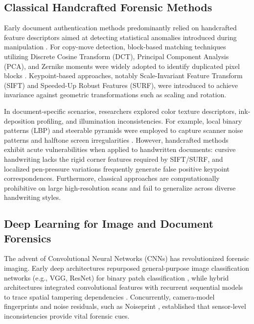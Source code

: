 \documentclass[runningheads]{llncs}
\begin{document}
\subsection{Classical Handcrafted Forensic Methods}\label{subsec2_1}
Early document authentication methods predominantly relied on handcrafted feature descriptors aimed at detecting statistical anomalies introduced during manipulation \cite{bib1}. For copy-move detection, block-based matching techniques utilizing Discrete Cosine Transform (DCT), Principal Component Analysis (PCA), and Zernike moments were widely adopted to identify duplicated pixel blocks \cite{bib1}. Keypoint-based approaches, notably Scale-Invariant Feature Transform (SIFT) and Speeded-Up Robust Features (SURF), were introduced to achieve invariance against geometric transformations such as scaling and rotation.

In document-specific scenarios, researchers explored color texture descriptors, ink-deposition profiling, and illumination inconsistencies. For example, local binary patterns (LBP) and steerable pyramids were employed to capture scanner noise patterns and halftone screen irregularities \cite{bib1}. However, handcrafted methods exhibit acute vulnerabilities when applied to handwritten documents: cursive handwriting lacks the rigid corner features required by SIFT/SURF, and localized pen-pressure variations frequently generate false positive keypoint correspondences. Furthermore, classical approaches are computationally prohibitive on large high-resolution scans and fail to generalize across diverse handwriting styles.

\subsection{Deep Learning for Image and Document Forensics}\label{subsec2_2}
The advent of Convolutional Neural Networks (CNNs) has revolutionized forensic imaging. Early deep architectures repurposed general-purpose image classification networks (e.g., VGG, ResNet) for binary patch classification \cite{bib4}, while hybrid architectures integrated convolutional features with recurrent sequential models to trace spatial tampering dependencies \cite{bib5}. Concurrently, camera-model fingerprints and noise residuals, such as Noiseprint \cite{bib3}, established that sensor-level inconsistencies provide vital forensic cues.
\end{document}
